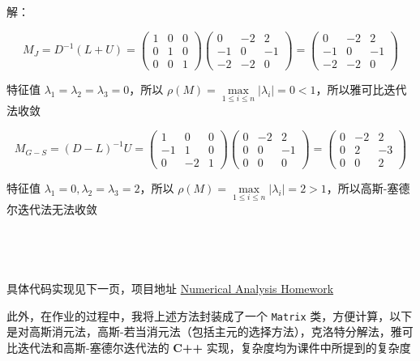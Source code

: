 \documentclass{article}
\begin{document}
\noindent 解：

$$
M_J = D^{-1}(L + U) = 
\begin{pmatrix}
    1& 0 & 0 \\
    0 & 1 & 0 \\
    0 & 0 & 1
\end{pmatrix}
\begin{pmatrix}
    0 & -2 & 2 \\
    -1 & 0 & -1 \\
    -2 & -2 & 0
\end{pmatrix}
=
\begin{pmatrix}
    0 & -2 & 2 \\
    -1 & 0 & -1 \\
    -2 & -2 & 0
\end{pmatrix}
$$

特征值 $\lambda_1 = \lambda_2 = \lambda_3 = 0$，所以 $\rho(M) = \max\limits_{1\leq i\leq n}|\lambda_i| = 0 < 1$，所以雅可比迭代法收敛

$$
M_{G-S} = (D - L)^{-1}U
=
\begin{pmatrix}
    1 & 0 & 0 \\
    -1 & 1 & 0 \\
    0 & -2 & 1
\end{pmatrix}
\begin{pmatrix}
    0 & -2 & 2 \\
    0 & 0 & -1 \\
    0 & 0 & 0
\end{pmatrix}
=
\begin{pmatrix}
    0 & -2 & 2 \\
    0 & 2 & -3 \\
    0 & 0 & 2
\end{pmatrix}
$$

特征值 $\lambda_1 = 0, \lambda_2 = \lambda_3 = 2$，所以 $\rho(M) = \max\limits_{1\leq i\leq n}|\lambda_i| = 2 > 1$，所以高斯-塞德尔迭代法无法收敛 \\ \\ \\ \\ \\

\noindent 具体代码实现见下一页，项目地址 \href{https://github.com/yyDing1/Numerical-Analysis-Homework}{Numerical Analysis Homework}

\clearpage
此外，在作业的过程中，我将上述方法封装成了一个 \texttt{Matrix} 类，方便计算，以下是对高斯消元法，高斯-若当消元法（包括主元的选择方法），克洛特分解法，雅可比迭代法和高斯-塞德尔迭代法的 \textbf{C++} 实现，复杂度均为课件中所提到的复杂度
\end{document}
